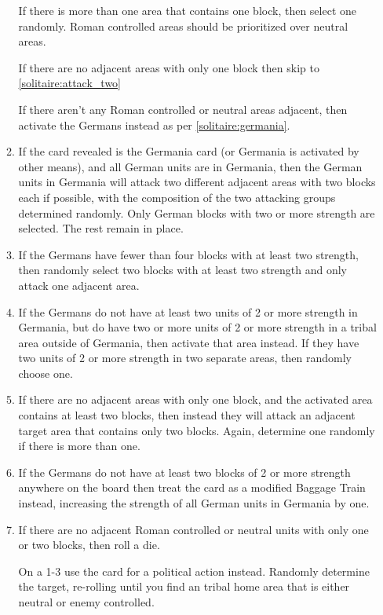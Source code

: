 \begin{enumerate}
\begin{enumerate}[leftmargin=0in]
    If there is more than one area that contains one block, then select one randomly. Roman controlled areas should be prioritized over neutral areas.
    
    If there are no adjacent areas with only one block then skip to \ref{solitaire:attack_two}
    
    If there aren't any Roman controlled or neutral areas adjacent, then activate the Germans instead as per \ref{solitaire:germania}.

    \item \label{solitaire:germania}If the card revealed is the Germania card (or Germania is activated by other means), and all German units are in Germania, then the German units in Germania will attack two different adjacent areas with two blocks each if possible, with the composition of the two attacking groups determined randomly. Only German blocks with two or more strength are selected. The rest remain in place.

    \item If the Germans have fewer than four blocks with at least two strength, then randomly select two blocks with at least two strength and only attack one adjacent area.
    
    \item If the Germans do not have at least two units of 2 or more strength in Germania, but do have two or more units of 2 or more strength in a tribal area outside of Germania, then activate that area instead. If they have two units of 2 or more strength in two separate areas, then randomly choose one.

    \item \label{solitaire:attack_two}If there are no adjacent areas with only one block, and the activated area contains at least two blocks, then instead they will attack an adjacent target area that contains only two blocks. Again, determine one randomly if there is more than one.
    
    \item If the Germans do not have at least two blocks of 2 or more strength anywhere on the board then treat the card as a modified Baggage Train instead, increasing the strength of all German units in Germania by one.

    \item If there are no adjacent Roman controlled or neutral units with only one or two blocks, then roll a die.
    
    On a 1-3 use the card for a political action instead. Randomly determine the target, re-rolling until you find an tribal home area that is either neutral or enemy controlled.
    

\end{enumerate}
\end{enumerate}
